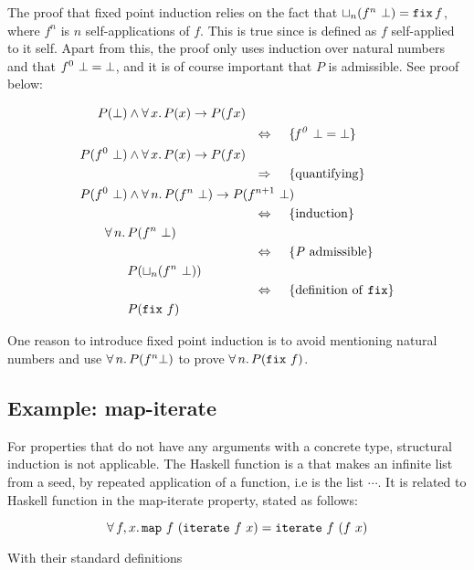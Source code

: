 The proof that fixed point induction relies on the fact that
$\lub{n}(f^n \w \bot) \eq \hs{fix} \, f$, where $f^n$ is $n$
self-applications of $f$. This is true since  is defined as
$f$ self-applied to it self. Apart from this, the proof only uses
induction over natural numbers and that $f^0 \,\, \bot = \bot$, and
it is of course important that $P$ is admissible. See proof below:

\begin{align*}
P(\bot) & \wedge \fa{x} P(x) \rightarrow P(f x) \\
\desclra{\mathit{f^0 \w \bot \eq \bot}} \\
P(f^0 \w \bot) & \wedge \fa{x} P(x) \rightarrow P(f x) \\
\descra{quantifying} \\
P(f^0 \w \bot) & \wedge \fa{n} P(f^n \w \bot) \rightarrow P(f^{n+1} \w \bot) \\
\desclra{induction} \\
\fa{n} & P(f^n \w \bot) \\
\desclra{\mathit{P} \w admissible} \\
& P(\lub{n}(f^n \w \bot)) \\
\desclra{definition \w of \w \hs{fix}} \\
& P(\hs{fix} \w f) \\
\end{align*}

One reason to introduce fixed point induction is to avoid
mentioning natural numbers and use $\forall \, n . \, P(f^n \bot)$ to prove
$\fa{n} P(\hs{fix} \w f)$.

\subsection{Example: map-iterate}
\label{sec:mapiter}

For properties that do not have any arguments with a concrete type,
structural induction is not applicable. The Haskell function
 is a that makes an infinite list from a seed, by repeated
application of a function, i.e  is the list
 $\cdots$. It is related to Haskell function
  in the map-iterate property, stated as follows:

\begin{equation*}
\faa{f}{x} \hs{map} \w f \w (\hs{iterate} \w f \w x) \eq
           \hs{iterate} \w f \w (f \w x)
\end{equation*}

With their standard definitions

